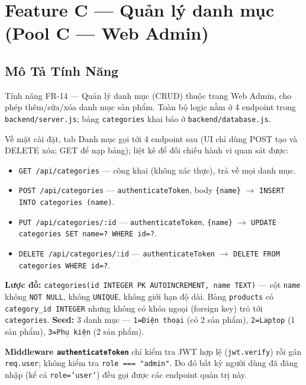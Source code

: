 \documentclass[12pt, a4paper]{report}
\begin{document}
\chapter{Feature C — Quản lý danh mục (Pool C — Web Admin)}

\section{Mô Tả Tính Năng}
Tính năng FR-14 — Quản lý danh mục (CRUD) thuộc trang Web Admin, cho phép
thêm/sửa/xóa danh mục sản phẩm. Toàn bộ logic nằm ở 4 endpoint trong
\texttt{backend/server.js}; bảng \texttt{categories} khai báo ở \texttt{backend/database.js}.

\noindent Về mặt cài đặt, tab Danh mục gọi tới 4 endpoint sau (UI chỉ dùng POST tạo và DELETE
xóa; GET để nạp bảng); liệt kê để đối chiếu hành vi quan sát được:
\begin{itemize}
    \item \texttt{GET /api/categories} — công khai (không xác thực), trả về mọi danh mục.
    \item \texttt{POST /api/categories} — \texttt{authenticateToken}, body \verb|{name}| $\to$
    \texttt{INSERT INTO categories (name)}.
    \item \texttt{PUT /api/categories/:id} — \texttt{authenticateToken}, \verb|{name}| $\to$
    \texttt{UPDATE categories SET name=? WHERE id=?}.
    \item \texttt{DELETE /api/categories/:id} — \texttt{authenticateToken} $\to$
    \texttt{DELETE FROM categories WHERE id=?}.
\end{itemize}

\noindent\textbf{Lược đồ:} \texttt{categories(id INTEGER PK AUTOINCREMENT, name TEXT)} — cột
\texttt{name} không \texttt{NOT NULL}, không \texttt{UNIQUE}, không giới hạn độ
dài. Bảng \texttt{products} có \texttt{category\_id INTEGER} nhưng không có khóa ngoại
(foreign key) trỏ tới \texttt{categories}. \textbf{Seed:} 3 danh mục — \texttt{1=Điện thoại}
(có 2 sản phẩm), \texttt{2=Laptop} (1 sản phẩm), \texttt{3=Phụ kiện} (2 sản phẩm).

\vspace{4pt}
\noindent\textbf{Middleware \texttt{authenticateToken}} chỉ kiểm tra JWT hợp lệ
(\texttt{jwt.verify}) rồi gán \texttt{req.user}; không kiểm tra \texttt{role ===
"admin"}. Do đó bất kỳ người dùng đã đăng nhập (kể cả \texttt{role='user'}) đều gọi được
các endpoint quản trị này.
\end{document}
